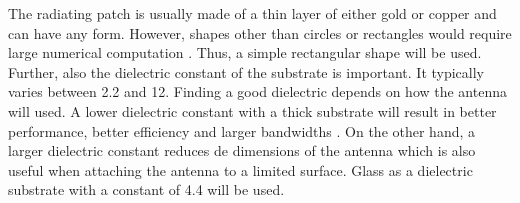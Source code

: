 The radiating patch is usually made of a thin layer of either gold or copper \cite{J14_antennadesign,J15_antennadesign}
and can have any form. However, shapes other than circles or rectangles would require large numerical computation \cite{J14_antennadesign}.
Thus, a simple rectangular shape will be used.
Further, also the dielectric constant of the substrate is important. It typically varies between 2.2 and 12.
Finding a good dielectric depends on how the antenna will used. A lower
dielectric constant with a thick substrate will result in better performance, better efficiency and larger bandwidths  \cite{J15_antennadesign}.
On the other hand, a larger dielectric constant reduces de dimensions of the antenna \cite{J14_antennadesign}
which is also useful when attaching the 
antenna to a limited surface. Glass as a dielectric substrate with a constant of 4.4 will be used.